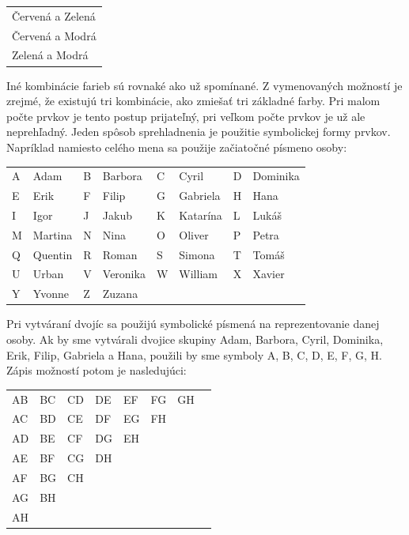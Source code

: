 \documentclass{article}
\begin{document}
\begin{table}[H]
  \centering
  \begin{tabular}{l}
    Červená a Zelená \\
    Červená a Modrá \\
    Zelená a Modrá
  \end{tabular}
\end{table}

\noindent
Iné kombinácie farieb sú rovnaké ako už spomínané. Z vymenovaných možností je zrejmé, že existujú tri kombinácie, ako zmiešať tri základné farby. Pri malom počte prvkov je tento postup prijateľný, pri veľkom počte prvkov je už ale neprehľadný. Jeden spôsob sprehladnenia je použitie symbolickej formy prvkov. Napríklad namiesto celého mena sa použije začiatočné písmeno osoby:

\begin{table}[H]
  \centering
  \begin{tabular}{ll ll ll ll}
    A & Adam     & B & Barbora  & C & Cyril    & D & Dominika \\
    E & Erik     & F & Filip    & G & Gabriela & H & Hana \\
    I & Igor     & J & Jakub    & K & Katarína & L & Lukáš \\
    M & Martina  & N & Nina     & O & Oliver   & P & Petra \\
    Q & Quentin  & R & Roman    & S & Simona   & T & Tomáš \\
    U & Urban    & V & Veronika & W & William  & X & Xavier \\
    Y & Yvonne   & Z & Zuzana   &   &          &   &         \\
  \end{tabular}
\end{table}

\noindent
Pri vytváraní dvojíc sa použijú symbolické písmená na reprezentovanie danej osoby. Ak by sme vytvárali dvojice skupiny Adam, Barbora, Cyril, Dominika, Erik, Filip, Gabriela a Hana, použili by sme symboly A, B, C, D, E, F, G, H. Zápis možností potom je nasledujúci:

\begin{table}[H]
  \centering
  \begin{tabular}{*{8}{l}}
    AB & BC & CD & DE & EF & FG & GH & \\
    AC & BD & CE & DF & EG & FH & & \\
    AD & BE & CF & DG & EH & & & \\
    AE & BF & CG & DH & & & & \\
    AF & BG & CH & & & & & \\
    AG & BH & & & & & & \\
    AH & & & & & & & \\
  \end{tabular}
\end{table}
\end{document}
